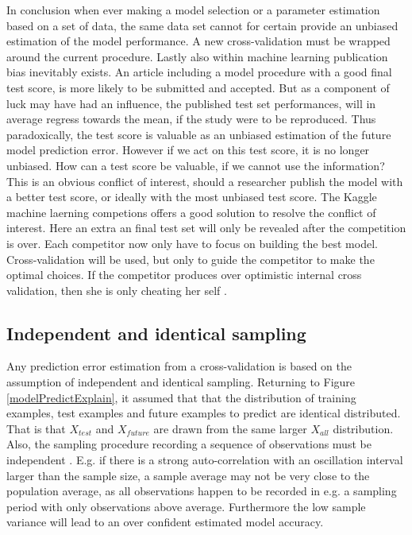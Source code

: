 In conclusion when ever making a model selection or a parameter estimation based on a set of data, the same data set cannot for certain provide an unbiased estimation of the model performance. A new cross-validation must be wrapped around the current procedure. Lastly also within machine learning publication bias inevitably exists. An article including a model procedure with a good final test score, is more likely to be submitted and accepted. But as a component of luck may have had an influence, the published test set performances, will in average regress towards the mean, if the study were to be reproduced. Thus paradoxically, the test score is valuable as an unbiased estimation of the future model prediction error. However if we act on this test score, it is no longer unbiased. How can a test score be valuable, if we cannot use the information? This is an obvious conflict of interest, should a researcher publish the model with a better test score, or ideally with the most unbiased test score. The Kaggle machine laerning competions offers a good solution to resolve the conflict of interest. Here an extra an final test set will only be revealed after the competition is over. Each competitor now only have to focus on building the best model. Cross-validation will be used, but only to guide the competitor to make the optimal choices. If the competitor produces over optimistic internal cross validation, then she is only cheating her self \cite{seroussi2015steps}.

\subsection{Independent and identical sampling}
\label{iid}
Any prediction error estimation from a cross-validation is based on the assumption of independent and identical sampling. Returning to Figure \ref{modelPredictExplain}, it assumed that that the distribution of training examples, test examples and future examples to predict are identical distributed. That is that $X_{test}$ and $X_{future}$ are drawn from the same larger $X_{all}$ distribution. Also, the sampling procedure recording a sequence of observations must be independent \cite{le2010performance}. E.g. if there is a strong auto-correlation with an oscillation interval larger than the sample size, a sample average may not be very close to the population average, as all observations happen to be recorded in e.g. a sampling period with only observations above average. Furthermore the low sample variance will lead to an over confident estimated model accuracy.

